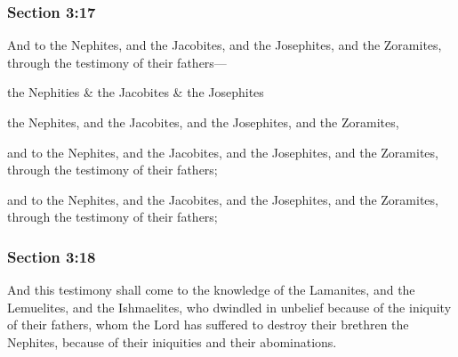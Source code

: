 	\subsubsection{Section 3:17} %
		\label{DC3-17}

		And to the Nephites, and the Jacobites, and the Josephites, and the Zoramites, through the testimony of their fathers---

		\begin{framed}
		\scriptsize
			\begin{compactdesc}
				\item[JSP] the Nephities \& the Jacobites \& the Josephites
				\item[BC] the Nephites, and the Jacobites, and the Josephites, and the Zoramites, 
				\item[DC 1835] and to the Nephites, and the Jacobites, and the Josephites, and the Zoramites, through the testimony of their fathers;
				\item[DC 1844] and to the Nephites, and the Jacobites, and the Josephites, and the Zoramites, through the testimony of their fathers;
			\end{compactdesc}
		\end{framed}

	\subsubsection{Section 3:18} %
		\label{DC3-18}

		And this testimony shall come to the knowledge of the Lamanites, and the Lemuelites, and the Ishmaelites, who dwindled in unbelief because of the iniquity of their fathers, whom the Lord has suffered to destroy their brethren the Nephites, because of their iniquities and their abominations.


